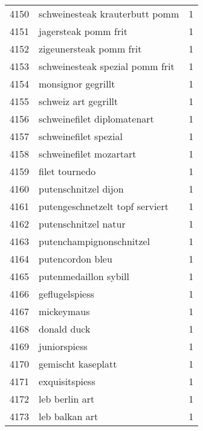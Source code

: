 \begin{tabular}{llr}
4150 &                     schweinesteak krauterbutt pomm &      1 \\
4151 &                               jagersteak pomm frit &      1 \\
4152 &                            zigeunersteak pomm frit &      1 \\
4153 &                    schweinesteak spezial pomm frit &      1 \\
4154 &                                 monsignor gegrillt &      1 \\
4155 &                               schweiz art gegrillt &      1 \\
4156 &                        schweinefilet diplomatenart &      1 \\
4157 &                              schweinefilet spezial &      1 \\
4158 &                            schweinefilet mozartart &      1 \\
4159 &                                     filet tournedo &      1 \\
4160 &                               putenschnitzel dijon &      1 \\
4161 &                    putengeschnetzelt topf serviert &      1 \\
4162 &                               putenschnitzel natur &      1 \\
4163 &                           putenchampignonschnitzel &      1 \\
4164 &                                   putencordon bleu &      1 \\
4165 &                              putenmedaillon sybill &      1 \\
4166 &                                     geflugelspiess &      1 \\
4167 &                                         mickeymaus &      1 \\
4168 &                                        donald duck &      1 \\
4169 &                                       juniorspiess &      1 \\
4170 &                                 gemischt kaseplatt &      1 \\
4171 &                                     exquisitspiess &      1 \\
4172 &                                     leb berlin art &      1 \\
4173 &                                     leb balkan art &      1 \\

\end{tabular}
